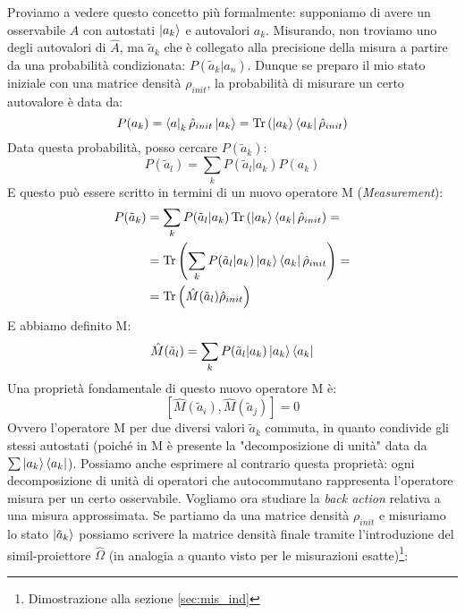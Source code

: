 \noindent Proviamo a vedere questo concetto più formalmente: supponiamo di avere un osservabile $A$ con autostati $\ket{a_k}$ e autovalori $a_k$. Misurando, non troviamo uno degli autovalori di $\hat A$, ma $\tilde a_k$ che è collegato alla precisione della misura a partire da una probabilità condizionata: $P(\tilde a _k | a_n)$.
Dunque se preparo il mio stato iniziale con una matrice densità $\rho_{init}$, la probabilità di misurare un certo autovalore è data da:
\begin{equation*}
    P(a_k) = \bra a_k \hat \rho_{init}\ket{a_k} = \Tr \left( \ket{a_k}\bra{a_k}\hat \rho_{init}\right)
\end{equation*}
\noindent Data questa probabilità, posso cercare $P(\tilde a _k)$:
\begin{equation*}
    P(\tilde a _l ) = \sum_k P(\tilde a_l | a_k ) P(a_k)
\end{equation*}
E questo può essere scritto in termini di un nuovo operatore M (\textit{Measurement}):
\begin{align}\label{eq_prob_tilde_m_op}
    P(\tilde a_k) & = \sum_k P(\tilde a_l | a_k ) \Tr \left( \ket{a_k}\bra{a_k}\hat \rho_{init}\right) = \nonumber \\ 
                  & = \Tr \left( \sum_k P(\tilde a_l | a_k ) \ket{a_k}\bra{a_k}\hat \rho_{init}\right) = \nonumber \\
                  & = \Tr \left( \hat M (\tilde a_l ) \hat \rho_{init}\right)
\end{align}
E abbiamo definito M:
\begin{equation*}
    \hat M(\tilde a_l) = \sum_k P(\tilde a _l | a_k ) \ket{a_k}\bra{a_k}
\end{equation*}
Una proprietà fondamentale di questo nuovo operatore M è:
\begin{equation*}
    \left[\hat M(\tilde a_i) , \hat M(\tilde a_j) \right]=0
\end{equation*}
Ovvero l'operatore M per due diversi valori $\tilde a_k$ commuta, in quanto condivide gli stessi autostati (poiché in M è presente la "decomposizione di unità" data da $\sum \ket{a_k}\bra{a_k}$).
Possiamo anche esprimere al contrario questa proprietà: ogni decomposizione di unità di operatori che autocommutano rappresenta l'operatore misura per un certo osservabile.
\vspace{0.2cm}
\noindent Vogliamo ora studiare la \textit{back action} relativa a una misura approssimata.
Se partiamo da una matrice densità $\rho_{init}$ e misuriamo lo stato $\ket{\tilde a_k}$ possiamo scrivere la matrice densità finale tramite l'introduzione del simil-proiettore $\hat \Omega$ (in analogia a quanto visto per le misurazioni esatte)\footnote{Dimostrazione alla sezione \ref{sec:mis_ind}}:
